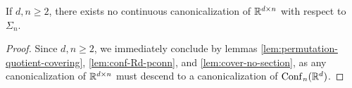 \begin{theorem}\label{thm:no-Sigman-canon-for-dxn}
    If $d,n \geq 2$, there exists no continuous canonicalization of $\mathbb{R}^{d \times n}$ with respect to $\Sigma_n$.
    \begin{proof}
        Since $d,n \geq 2$, we immediately conclude by lemmas \ref{lem:permutation-quotient-covering}, \ref{lem:conf-Rd-pconn}, and \ref{lem:cover-no-section}, as any canonicalization of $\mathbb{R}^{d \times n}$ must descend to a canonicalization of $\operatorname{Conf}_n(\mathbb{R}^d)$.
    \end{proof}
\end{theorem}


